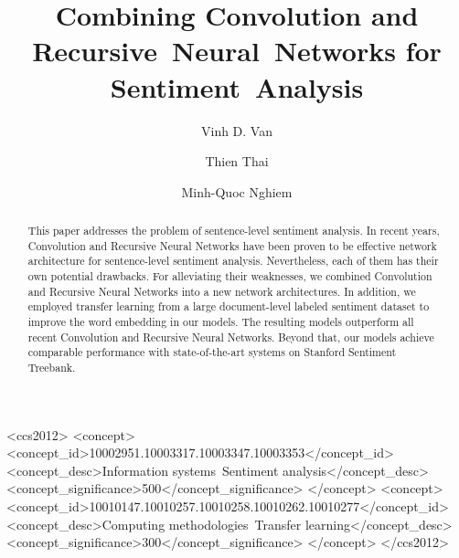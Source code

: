 \documentclass[sigconf]{acmart}
\begin{document}
\title[Combining CNN and RNN for Sentiment~Analysis]{Combining Convolution and Recursive~Neural~Networks for Sentiment~Analysis} %

\author{Vinh D. Van}

\author{Thien Thai}

\author{Minh-Quoc Nghiem}

\renewcommand{\shortauthors}{V. Van et al.}


\begin{abstract}
This paper addresses the problem of sentence-level sentiment analysis.
In recent years, Convolution and Recursive Neural Networks have been proven to be effective network architecture for sentence-level sentiment analysis.
Nevertheless, each of them has their own potential drawbacks.
For alleviating their weaknesses, we combined Convolution and Recursive Neural Networks into a new network architectures.
In addition, we employed transfer learning from a large document-level labeled sentiment dataset to improve the word embedding in our models.
The resulting models outperform all recent Convolution and Recursive Neural Networks.
Beyond that, our models achieve comparable performance with state-of-the-art systems on Stanford Sentiment Treebank.
\end{abstract}

%
%
\begin{CCSXML}
	<ccs2012>
	<concept>
	<concept_id>10002951.10003317.10003347.10003353</concept_id>
	<concept_desc>Information systems~Sentiment analysis</concept_desc>
	<concept_significance>500</concept_significance>
	</concept>
	<concept>
	<concept_id>10010147.10010257.10010258.10010262.10010277</concept_id>
	<concept_desc>Computing methodologies~Transfer learning</concept_desc>
	<concept_significance>300</concept_significance>
	</concept>
	</ccs2012>
\end{CCSXML}
\end{document}
